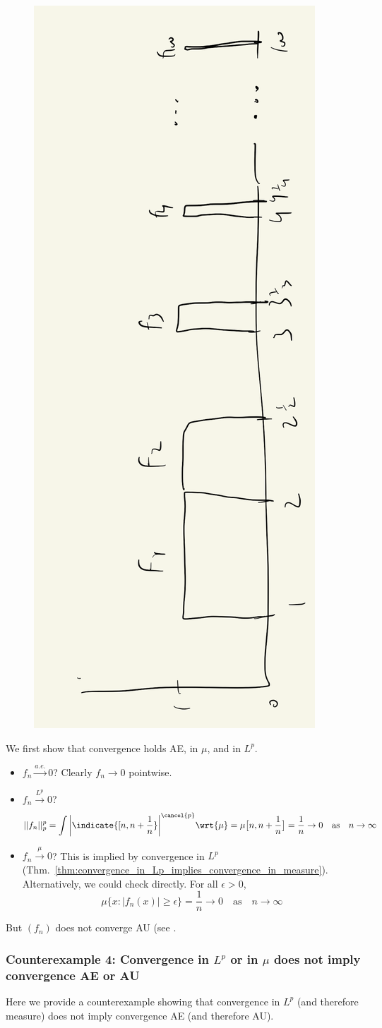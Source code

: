 \documentclass{article} %
\newcommand{\convergenceAE}{\stackrel{a.e.}{\to}}
\newcommand{\convergenceInMu}{\stackrel{\mu}{\to}}
\newcommand{\convergenceInLp}{\stackrel{L^p}{\to}}
\begin{document}
\begin{figure}[H]
\centering
\includegraphics[width=.25\textwidth, angle=270]{images/modes_of_convergence_counter_example_3}	
\caption{}
\label{fig:modes_of_convergence_counter_example_3}	
\end{figure}

We first show that convergence holds AE, in $\mu$, and in $L^p$.
\begin{itemize}
\item $f_n \convergenceAE 0$? \greencheck  Clearly $f_n \to 0$ pointwise.	
\item $f_n \convergenceInLp 0$? \greencheck  
\[ ||f_n||_p^p = \int \bigg| \indicate{[n, n + \frac{1}{n}} \bigg|^{\cancel{p}} \wrt{\mu} = \mu\big[n , n+\frac{1}{n}\big] = \frac{1}{n} \to 0 \quad \text{as} \quad n \to \infty\]
\item $f_n \convergenceInMu 0$? \greencheck This is implied by convergence in $L^p$ (Thm.~\ref{thm:convergence_in_Lp_implies_convergence_in_measure}).  Alternatively, we could check directly. For all $\epsilon >0$,
\[ \mu \big\{ x : |f_n(x)| \geq \epsilon \big\} = \frac{1}{n} \to 0 \quad \text{as} \quad n \to \infty \]  
\end{itemize}

But $(f_n)$ does not converge AU (see \cite[pp.99]{ash2000probability}.
 

\subsubsection{Counterexample 4: Convergence in $L^p$ or in $\mu$ does not imply convergence  AE or AU}


Here we provide a counterexample showing that convergence in $L^p$ (and therefore measure) does not imply convergence AE (and therefore AU).
\end{document}
